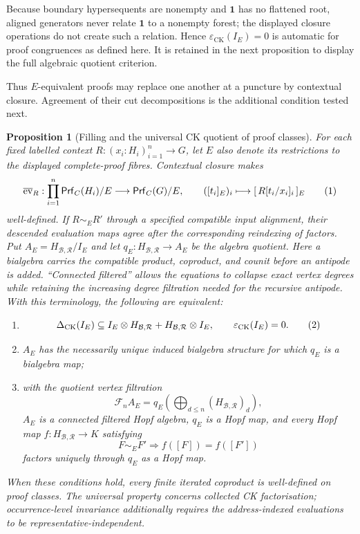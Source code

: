 \documentclass[10pt,a4paper]{article}
\theoremstyle{plain}
\newtheorem{proposition}[theorem]{Proposition}
\theoremstyle{definition}
\theoremstyle{remark}
\newcommand{\Base}{\mathcal B}
\newcommand{\Rules}{\mathcal R}
\newcommand{\Hlic}{H_{\Base,\Rules}}
\newcommand{\DeltaCK}{\Delta_{\mathrm{CK}}}
\newcommand{\epsCK}{\varepsilon_{\mathrm{CK}}}
\newcommand{\one}{\mathbf 1}
\newcommand{\Prf}{\mathsf{Prf}}
\newcommand{\eqtag}{\refstepcounter{equation}\tag{\theequation}}
\begin{document}
Because boundary hypersequents are nonempty and \(\one\) has no flattened
root, aligned generators never relate \(\one\) to a nonempty forest; the
displayed closure operations do not create such a relation.  Hence
\(\epsCK(I_E)=0\) is automatic for proof congruences as defined here.  It is
retained in the next proposition to display the full algebraic quotient
criterion.

Thus \(E\)-equivalent proofs may replace one another at a puncture by contextual
closure.  Agreement of their cut decompositions is the additional
condition tested next.

\begin{proposition}[Filling and the universal CK quotient of proof classes]
\label{prop:coideal-diagnostic}
For each fixed labelled context
\(R:(x_i:H_i)_{i=1}^n\to G\), let \(E\) also denote its restrictions to
the displayed complete-proof fibres.  Contextual closure makes
\[
 \overline{\operatorname{ev}}_R:
   \prod_{i=1}^n\Prf_C(H_i)/E\longrightarrow\Prf_C(G)/E,
 \qquad
 ([t_i]_E)_i\longmapsto[\,R[t_i/x_i]_i\,]_E
\eqtag\label{eq:proof-class-filling}
\]
well-defined.  If \(R\sim_E R'\) through a specified compatible input
alignment, their descended evaluation maps agree after the corresponding
reindexing of factors.
Put \(A_E=\Hlic/I_E\) and let \(q_E:\Hlic\to A_E\) be the algebra
quotient.  Here a \emph{bialgebra} carries the compatible product, coproduct, and
counit before an antipode is added.  ``Connected filtered'' allows the
equations to collapse exact vertex degrees while retaining the increasing
degree filtration needed for the recursive antipode.
With this terminology, the following are equivalent:
\begin{enumerate}[label=(\roman*)]
\item
\[
 \DeltaCK(I_E)\subseteq
       I_E\otimes\Hlic+\Hlic\otimes I_E,
 \qquad
 \epsCK(I_E)=0.
\eqtag\label{eq:coideal-diagnostic}
\]
\item \(A_E\) has the necessarily unique induced bialgebra structure for
which \(q_E\) is a bialgebra map;
\item with the quotient vertex filtration
\[
 \mathcal F_nA_E
   =q_E\!\left(\bigoplus_{d\le n}(\Hlic)_d\right),
\]
\(A_E\) is a connected filtered Hopf algebra, \(q_E\) is a Hopf map, and
every Hopf map \(f:\Hlic\to K\) satisfying
\[
       F\sim_EF'\Longrightarrow f([F])=f([F'])
\]
factors uniquely through \(q_E\) as a Hopf map.
\end{enumerate}
When these conditions hold, every finite iterated coproduct is
well-defined on proof classes.  The universal property concerns collected
CK factorisation; occurrence-level invariance additionally requires the
address-indexed evaluations to be representative-independent.
\end{proposition}
\end{document}
